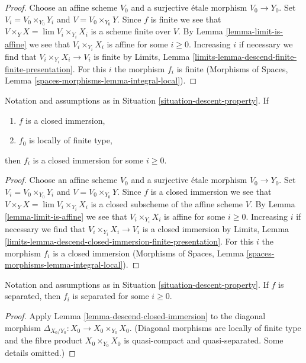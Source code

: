 \begin{proof}
Choose an affine scheme $V_0$ and a surjective \'etale morphism $V_0 \to Y_0$.
Set $V_i = V_0 \times_{Y_0} Y_i$ and $V = V_0 \times_{Y_0} Y$.
Since $f$ is finite we see that $V \times_Y X = \lim V_i \times_{Y_i} X_i$
is a scheme finite over $V$. By Lemma \ref{lemma-limit-is-affine} we see that
$V_i \times_{Y_i} X_i$ is affine for some $i \geq 0$. Increasing $i$ if
necessary we find that $V_i \times_{Y_i} X_i \to V_i$ is finite by
Limits, Lemma \ref{limits-lemma-descend-finite-finite-presentation}.
For this $i$ the morphism $f_i$ is finite
(Morphisms of Spaces, Lemma \ref{spaces-morphisms-lemma-integral-local}).
\end{proof}

\begin{lemma}
\label{lemma-descend-closed-immersion}
Notation and assumptions as in Situation \ref{situation-descent-property}. If
\begin{enumerate}
\item $f$ is a closed immersion,
\item $f_0$ is locally of finite type,
\end{enumerate}
then $f_i$ is a closed immersion for some $i \geq 0$.
\end{lemma}

\begin{proof}
Choose an affine scheme $V_0$ and a surjective \'etale morphism $V_0 \to Y_0$.
Set $V_i = V_0 \times_{Y_0} Y_i$ and $V = V_0 \times_{Y_0} Y$.
Since $f$ is a closed immersion we see that
$V \times_Y X = \lim V_i \times_{Y_i} X_i$
is a closed subscheme of the affine scheme $V$. By
Lemma \ref{lemma-limit-is-affine} we see that
$V_i \times_{Y_i} X_i$ is affine for some $i \geq 0$. Increasing $i$ if
necessary we find that $V_i \times_{Y_i} X_i \to V_i$ is a closed immersion by
Limits, Lemma \ref{limits-lemma-descend-closed-immersion-finite-presentation}.
For this $i$ the morphism $f_i$ is a closed immersion
(Morphisms of Spaces, Lemma \ref{spaces-morphisms-lemma-integral-local}).
\end{proof}

\begin{lemma}
\label{lemma-descend-separated-morphism}
Notation and assumptions as in Situation \ref{situation-descent-property}.
If $f$ is separated, then $f_i$ is separated for some $i \geq 0$.
\end{lemma}

\begin{proof}
Apply Lemma \ref{lemma-descend-closed-immersion}
to the diagonal morphism $\Delta_{X_0/Y_0} : X_0 \to X_0 \times_{Y_0} X_0$.
(Diagonal morphisms are locally of finite type
and the fibre product $X_0 \times_{Y_0} X_0$ is quasi-compact and
quasi-separated. Some details omitted.)
\end{proof}

